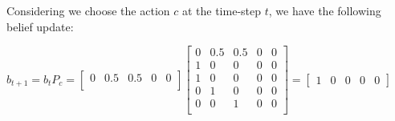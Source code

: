 \documentclass{article}
\begin{document}
\bigskip

Considering we choose the action $c$ at the time-step $t$, we have the following belief update:

\medskip

$
  \hat{b}_{t+1} = b_t P_c = 
  \begin{bmatrix}
    0 & 0.5 & 0.5 & 0 & 0 \\
  \end{bmatrix}
  \begin{bmatrix}
    0 & 0.5 & 0.5 & 0 & 0 \\
    1 & 0 & 0 & 0 & 0 \\
    1 & 0 & 0 & 0 & 0 \\
    0 & 1 & 0 & 0 & 0 \\
    0 & 0 & 1 & 0 & 0 \\
  \end{bmatrix}
  = \begin{bmatrix}
    1 & 0 & 0 & 0 & 0
  \end{bmatrix}
$
\end{document}
